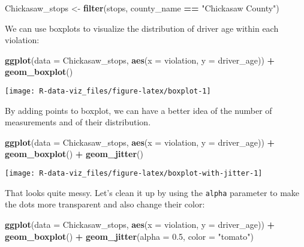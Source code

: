 \documentclass[]{book}
\newenvironment{Shaded}{\begin{snugshade}}{\end{snugshade}}
\newcommand{\KeywordTok}[1]{\textcolor[rgb]{0.13,0.29,0.53}{\textbf{#1}}}
\newcommand{\DataTypeTok}[1]{\textcolor[rgb]{0.13,0.29,0.53}{#1}}
\newcommand{\FloatTok}[1]{\textcolor[rgb]{0.00,0.00,0.81}{#1}}
\newcommand{\StringTok}[1]{\textcolor[rgb]{0.31,0.60,0.02}{#1}}
\newcommand{\OperatorTok}[1]{\textcolor[rgb]{0.81,0.36,0.00}{\textbf{#1}}}
\newcommand{\NormalTok}[1]{#1}
\theoremstyle{definition}
\theoremstyle{definition}
\theoremstyle{definition}
\theoremstyle{remark}
\begin{document}
\begin{Shaded}
\begin{Highlighting}[]
\NormalTok{Chickasaw_stops <-}\StringTok{ }\KeywordTok{filter}\NormalTok{(stops, county_name }\OperatorTok{==}\StringTok{ "Chickasaw County"}\NormalTok{)}
\end{Highlighting}
\end{Shaded}

We can use boxplots to visualize the distribution of driver age within
each violation:

\begin{Shaded}
\begin{Highlighting}[]
\KeywordTok{ggplot}\NormalTok{(}\DataTypeTok{data =}\NormalTok{ Chickasaw_stops, }\KeywordTok{aes}\NormalTok{(}\DataTypeTok{x =}\NormalTok{ violation, }\DataTypeTok{y =}\NormalTok{ driver_age)) }\OperatorTok{+}
\StringTok{    }\KeywordTok{geom_boxplot}\NormalTok{()}
\end{Highlighting}
\end{Shaded}

\texttt{[image: R-data-viz\_files/figure-latex/boxplot-1]}

By adding points to boxplot, we can have a better idea of the number of
measurements and of their distribution.

\begin{Shaded}
\begin{Highlighting}[]
\KeywordTok{ggplot}\NormalTok{(}\DataTypeTok{data =}\NormalTok{ Chickasaw_stops, }\KeywordTok{aes}\NormalTok{(}\DataTypeTok{x =}\NormalTok{ violation, }\DataTypeTok{y =}\NormalTok{ driver_age)) }\OperatorTok{+}
\StringTok{    }\KeywordTok{geom_boxplot}\NormalTok{() }\OperatorTok{+}
\StringTok{    }\KeywordTok{geom_jitter}\NormalTok{()}
\end{Highlighting}
\end{Shaded}

\texttt{[image: R-data-viz\_files/figure-latex/boxplot-with-jitter-1]}

That looks quite messy. Let's clean it up by using the \texttt{alpha}
parameter to make the dots more transparent and also change their color:

\begin{Shaded}
\begin{Highlighting}[]
\KeywordTok{ggplot}\NormalTok{(}\DataTypeTok{data =}\NormalTok{ Chickasaw_stops, }\KeywordTok{aes}\NormalTok{(}\DataTypeTok{x =}\NormalTok{ violation, }\DataTypeTok{y =}\NormalTok{ driver_age)) }\OperatorTok{+}
\StringTok{    }\KeywordTok{geom_boxplot}\NormalTok{() }\OperatorTok{+}
\StringTok{    }\KeywordTok{geom_jitter}\NormalTok{(}\DataTypeTok{alpha =} \FloatTok{0.5}\NormalTok{, }\DataTypeTok{color =} \StringTok{"tomato"}\NormalTok{)}
\end{Highlighting}
\end{Shaded}
\end{document}
